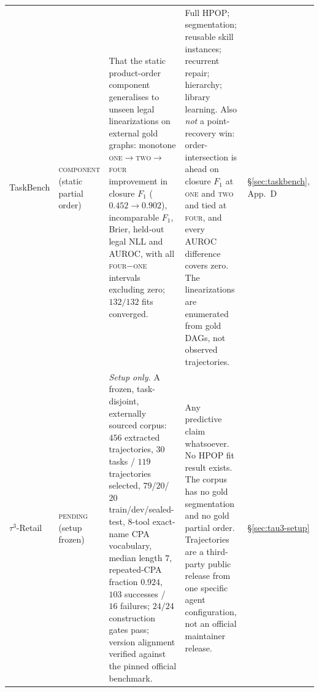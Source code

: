 \begin{table}[p]
\begin{tabularx}{\textwidth}{@{}l l X X l@{}}
TaskBench
& \textsc{component} \newline (static partial order)
& That the static product-order component generalises to unseen legal
  linearizations on external gold graphs: monotone
  \textsc{one}$\to$\textsc{two}$\to$\textsc{four} improvement in closure $F_1$
  ($0.452 \to 0.902$), incomparable $F_1$, Brier, held-out legal NLL and AUROC,
  with all \textsc{four}$-$\textsc{one} intervals excluding zero; $132/132$
  fits converged.
& Full HPOP; segmentation; reusable skill instances; recurrent repair;
  hierarchy; library learning. Also \emph{not} a point-recovery win:
  order-intersection is ahead on closure $F_1$ at \textsc{one} and \textsc{two}
  and tied at \textsc{four}, and every AUROC difference covers zero. The
  linearizations are enumerated from gold DAGs, not observed trajectories.
& \S\ref{sec:taskbench}, App.~D \\

$\tau^3$-Retail
& \textsc{pending} \newline (setup frozen)
& \emph{Setup only.} A frozen, task-disjoint, externally sourced corpus:
  $456$ extracted trajectories, $30$ tasks / $119$ trajectories selected,
  $79$/$20$/$20$ train/dev/sealed-test, $8$-tool exact-name CPA vocabulary,
  median length $7$, repeated-CPA fraction $0.924$, $103$ successes /
  $16$ failures; $24/24$ construction gates pass; version alignment verified
  against the pinned official benchmark.
& Any predictive claim whatsoever. No HPOP fit result exists. The corpus has no
  gold segmentation and no gold partial order. Trajectories are a third-party
  public release from one specific agent configuration, not an official
  maintainer release.
& \S\ref{sec:tau3-setup} \\

\bottomrule
\end{tabularx}
\end{table}

